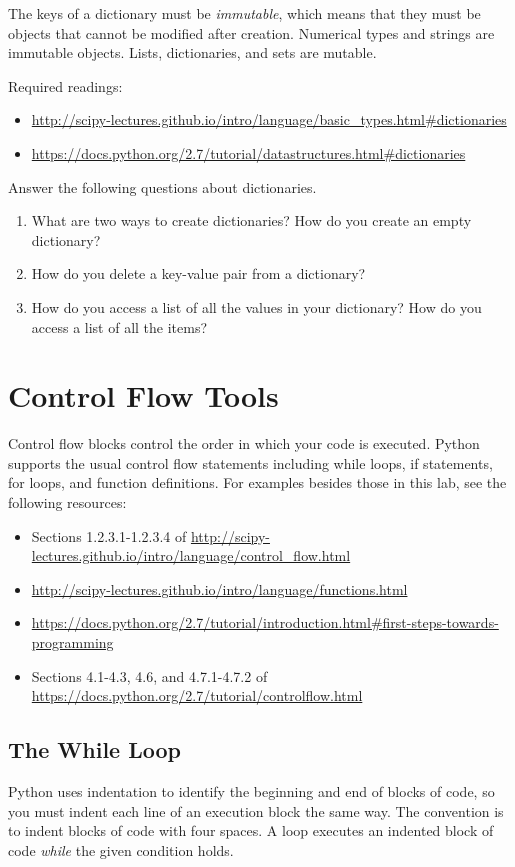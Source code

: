 The keys of a dictionary must be \emph{immutable}, which means that they must be objects that cannot be modified after creation. Numerical types and strings are immutable objects. Lists, dictionaries, and sets are mutable.

Required readings:
\begin{itemize}
\item \url{http://scipy-lectures.github.io/intro/language/basic_types.html#dictionaries}
\item \url{https://docs.python.org/2.7/tutorial/datastructures.html#dictionaries}
\end{itemize}

\begin{problem}
Answer the following questions about dictionaries.
\begin{enumerate}
\item What are two ways to create dictionaries? How do you create an empty dictionary?
\item How do you delete a key-value pair from a dictionary?
\item How do you access a list of all the values in your dictionary?  
How do you access a list of all the items?
\end{enumerate}
\end{problem}


\section*{Control Flow Tools}
Control flow blocks control the order in which your code is executed.
Python supports the usual control flow statements 
including while loops, if statements, for loops, and function definitions. For examples besides those in this lab, see the following resources:

\begin{itemize}
\item Sections 1.2.3.1-1.2.3.4 of \url{http://scipy-lectures.github.io/intro/language/control_flow.html}
\item \url{http://scipy-lectures.github.io/intro/language/functions.html}
\item \url{https://docs.python.org/2.7/tutorial/introduction.html#first-steps-towards-programming}
\item Sections 4.1-4.3, 4.6, and 4.7.1-4.7.2 of \url{https://docs.python.org/2.7/tutorial/controlflow.html}
\end{itemize}

\subsection*{The While Loop}
Python uses indentation to identify the beginning and end of blocks of code, so you must indent each line of an execution block the same way.
The convention is to indent blocks of code with four spaces. A  loop executes an indented block of code \emph{while} the given condition holds. 

